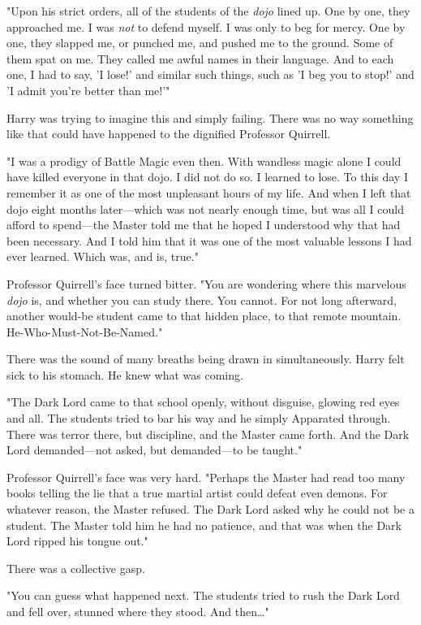 "Upon his strict orders, all of the students of the \emph{dojo} lined up. One 
by one, they approached me. I was \emph{not} to defend myself. I was only to 
beg for mercy. One by one, they slapped me, or punched me, and pushed me to the 
ground. Some of them spat on me. They called me awful names in their language. 
And to each one, I had to say, 'I lose!' and similar such things, such as 'I 
beg you to stop!' and 'I admit you're better than me!'"

Harry was trying to imagine this and simply failing. There was no way something 
like that could have happened to the dignified Professor Quirrell.

"I was a prodigy of Battle Magic even then. With wandless magic alone I could 
have killed everyone in that dojo. I did not do so. I learned to lose. To this 
day I remember it as one of the most unpleasant hours of my life. And when I 
left that dojo eight months later---which was not nearly enough time, but was 
all I could afford to spend---the Master told me that he hoped I understood why 
that had been necessary. And I told him that it was one of the most valuable 
lessons I had ever learned. Which was, and is, true."

Professor Quirrell's face turned bitter. "You are wondering where this 
marvelous \emph{dojo} is, and whether you can study there. You cannot. For not 
long afterward, another would-be student came to that hidden place, to that 
remote mountain. He-Who-Must-Not-Be-Named."

There was the sound of many breaths being drawn in simultaneously. Harry felt 
sick to his stomach. He knew what was coming.

"The Dark Lord came to that school openly, without disguise, glowing red eyes 
and all. The students tried to bar his way and he simply Apparated through. 
There was terror there, but discipline, and the Master came forth. And the Dark 
Lord demanded---not asked, but demanded---to be taught."

Professor Quirrell's face was very hard. "Perhaps the Master had read too many 
books telling the lie that a true martial artist could defeat even demons. For 
whatever reason, the Master refused. The Dark Lord asked why he could not be a 
student. The Master told him he had no patience, and that was when the Dark 
Lord ripped his tongue out."

There was a collective gasp.

"You can guess what happened next. The students tried to rush the Dark Lord and 
fell over, stunned where they stood. And then{\ldots}"

